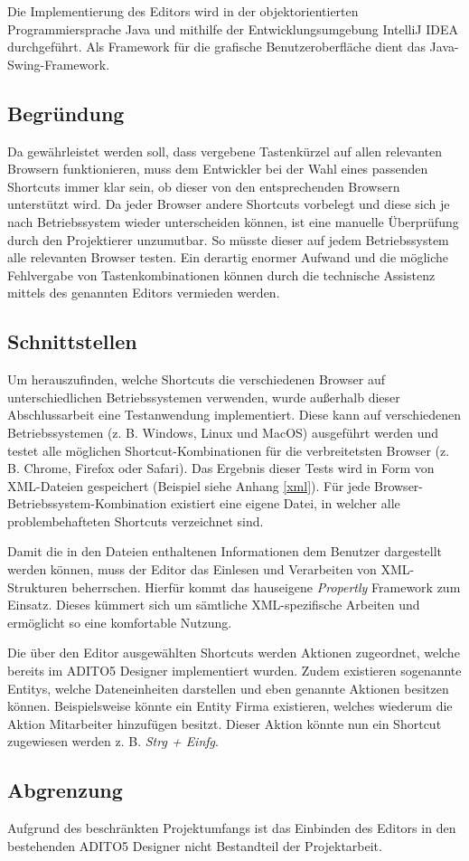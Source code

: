 Die Implementierung des Editors wird in der objektorientierten Programmiersprache Java und mithilfe der Entwicklungsumgebung IntelliJ IDEA durchgeführt. Als Framework für die grafische Benutzeroberfläche dient das Java-Swing-Framework.

\subsection{Begründung}

Da gewährleistet werden soll, dass vergebene Tastenkürzel auf allen relevanten Browsern funktionieren, muss dem Entwickler bei der Wahl eines passenden Shortcuts immer klar sein, ob dieser von den entsprechenden Browsern unterstützt wird. Da jeder Browser andere Shortcuts vorbelegt und diese sich je nach Betriebssystem wieder unterscheiden können, ist eine manuelle Überprüfung durch den Projektierer unzumutbar. So müsste dieser auf jedem Betriebssystem alle relevanten Browser testen. Ein derartig enormer Aufwand und die mögliche Fehlvergabe von Tastenkombinationen können durch die technische Assistenz mittels des genannten Editors vermieden werden.

\subsection{Schnittstellen}
\label{schnittstellen} 

Um herauszufinden, welche Shortcuts die verschiedenen Browser auf unterschiedlichen Betriebssystemen verwenden, wurde außerhalb dieser Abschlussarbeit eine Testanwendung implementiert. Diese kann auf verschiedenen Betriebssystemen (z. B. Windows, Linux und MacOS) ausgeführt werden und testet alle möglichen Shortcut-Kombinationen für die verbreitetsten Browser (z. B. Chrome, Firefox oder Safari). Das Ergebnis dieser Tests wird in Form von XML-Dateien gespeichert (Beispiel siehe Anhang \ref{xml}). Für jede Browser-Betriebssystem-Kombination existiert eine eigene Datei, in welcher alle problembehafteten Shortcuts verzeichnet sind.

Damit die in den Dateien enthaltenen Informationen dem Benutzer dargestellt werden können, muss der Editor das Einlesen und Verarbeiten von XML-Strukturen beherrschen. Hierfür kommt das hauseigene \emph{Propertly} Framework zum Einsatz. Dieses kümmert sich um sämtliche XML-spezifische Arbeiten und ermöglicht so eine komfortable Nutzung.

Die über den Editor ausgewählten Shortcuts werden Aktionen zugeordnet, welche bereits im ADITO5 Designer implementiert wurden. Zudem existieren sogenannte Entitys, welche Dateneinheiten darstellen und eben genannte Aktionen besitzen können. Beispielsweise könnte ein Entity \glqq Firma\grqq\xspace existieren, welches wiederum die Aktion \glqq Mitarbeiter hinzufügen\grqq\xspace besitzt. Dieser Aktion könnte nun ein Shortcut zugewiesen werden z. B. \emph{Strg + Einfg}.


\subsection{Abgrenzung}

Aufgrund des beschränkten Projektumfangs ist das Einbinden des Editors in den bestehenden ADITO5 Designer nicht Bestandteil der Projektarbeit.






\newpage